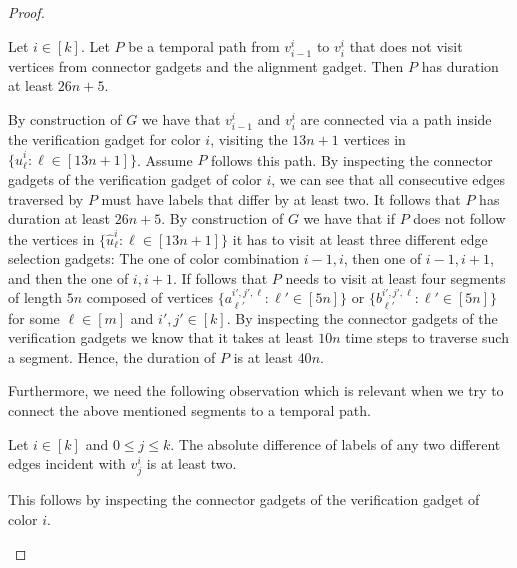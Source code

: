 \documentclass[a4paper,UKenglish,cleveref, autoref, thm-restate]{lipics-v2021}
\begin{document}
\begin{proof}
\begin{claim}\label{claim:16}
    Let $i\in[k]$. Let $P$ be a temporal path from $v_{i-1}^i$ to $v_i^i$ that does not visit vertices from connector gadgets and the alignment gadget. Then $P$ has duration at least $26n+5$.
\end{claim}
\begin{claimproof}
    By construction of $G$ we have that $v^i_{i-1}$ and $v^i_i$ are connected via a path inside the verification gadget for color $i$, visiting the $13n+1$ vertices in $\{\hat{u}^i_\ell :  \ell\in[13n+1]\}$. Assume $P$ follows this path. By inspecting the connector gadgets of the verification gadget of color $i$, we can see that all consecutive edges traversed by $P$ must have labels that differ by at least two. It follows that $P$ has duration at least $26n+5$. By construction of $G$ we have that if $P$ does not follow the vertices in $\{\hat{u}^i_\ell :  \ell\in[13n+1]\}$ it has to visit at least three different edge selection gadgets: The one of color combination $i-1,i$, then one of $i-1,i+1$, and then the one of $i,i+1$. If follows that $P$ needs to visit at least four segments of length $5n$ composed of vertices $\{a^{i',j',\ell}_{\ell'} :  \ell'\in[5n]\}$ or $\{b^{i',j',\ell}_{\ell'} :  \ell'\in[5n]\}$ for some $\ell\in[m]$ and $i',j'\in[k]$. By inspecting the connector gadgets of the verification gadgets we know that it takes at least $10n$ time steps to traverse such a segment. Hence, the duration of $P$ is at least $40n$.
\end{claimproof}

Furthermore, we need the following observation which is relevant when we try to connect the above mentioned segments to a temporal path.

\begin{claim}\label{claim:17}
Let $i\in[k]$ and $0\le j\le k$. The absolute difference of labels of any two different edges incident with $v^i_j$ is at least two.
\end{claim}
\begin{claimproof}
    This follows by inspecting the connector gadgets of the verification gadget of color $i$.
\end{claimproof}


\end{proof}
\end{document}
